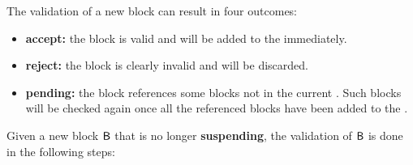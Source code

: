 The validation of a new block can result in four outcomes:
\begin{itemize}

	\item {\bf accept:} the block is valid  and will be added to the \tg immediately.
	      
	\item {\bf reject:} the block is clearly invalid and will be discarded.
	      
	\item {\bf pending:} the block references some blocks not in the current \tg. Such blocks will be checked again once all the referenced blocks have been added to the \tg.
\end{itemize}
%
\medskip
Given a new block $\textsf{B}$ that is no longer {\bf suspending}, the validation of $\textsf{B}$ is done in the following steps:
